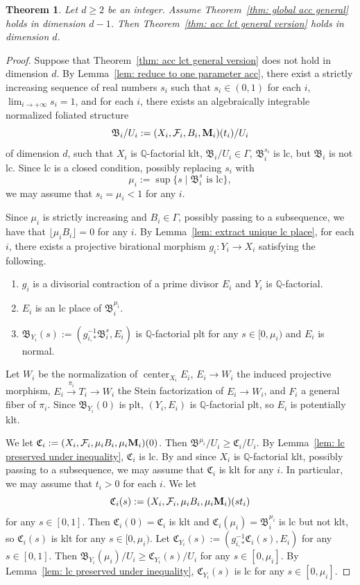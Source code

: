 \documentclass[11pt,reqno]{amsart}
\numberwithin{equation}{section}
\newcommand{\Mm}{{\bf{M}}}
\newcommand{\Cc}{\mathfrak{C}}
\newcommand{\Center}{\operatorname{center}}
\newcommand{\Bb}{{\mathfrak{B}}}
\newcommand{\Ff}{\mathcal{F}}
\newcommand{\Ii}{\Gamma}
\newtheorem{thm}{Theorem}[section]
\theoremstyle{definition}
\begin{document}
\begin{thm}\label{thm: global to local}
   Let $d\geq 2$ be an integer. Assume Theorem~\ref{thm: global acc general} holds in dimension $d-1$. Then Theorem~\ref{thm: acc lct general version} holds in dimension $d$.
\end{thm}
\begin{proof}
Suppose that Theorem~\ref{thm: acc lct general version} does not hold in dimension $d$. By Lemma~\ref{lem: reduce to one parameter acc}, there exist a strictly increasing sequence of real numbers $s_i$ such that $s_i\in (0,1)$ for each $i$, $\lim_{i\rightarrow+\infty}s_i=1$, and for each $i$, there exists an algebraically integrable normalized foliated structure 
$$\Bb_i/U_i:=(X_i,\Ff_i,B_i,\Mm_i)(t_i)/U_i$$
of dimension $d$, such that $X_i$ is $\mathbb Q$-factorial klt, $\Bb_i/U_i\in\Ii$, $\Bb_i^{s_i}$ is lc, but $\Bb_i$ is not lc. Since lc is a closed condition, possibly replacing $s_i$ with
$$\mu_i:=\sup\{s\mid \Bb_i^s\text{ is lc}\},$$
we may assume that $s_i=\mu_i<1$ for any $i$.

Since $\mu_i$ is strictly increasing and $B_i\in\Ii$, possibly passing to a subsequence, we have that $\lfloor\mu_iB_i\rfloor=0$ for any $i$. By Lemma~\ref{lem: extract unique lc place}, for each $i$, there exists a projective birational morphism $g_i: Y_i\rightarrow X_i$ satisfying the following.
\begin{enumerate}
    \item $g_i$ is a divisorial contraction of a prime divisor $E_i$ and $Y_i$ is $\mathbb Q$-factorial.
    \item $E_i$ is an lc place of $\Bb_i^{\mu_i}$.
    \item $\Bb_{Y_i}(s):=(g_{i,*}^{-1}\Bb_i^s,E_i)$ is $\mathbb Q$-factorial plt for any $s\in [0,\mu_i)$ and $E_i$ is normal.
\end{enumerate}
Let $W_i$ be the normalization of $\Center_{X_i}E_i$, $E_i\rightarrow W_i$ the induced projective morphism, 
$E_i\xrightarrow{\pi_i}T_i\rightarrow W_i$ the Stein factorization of $E_i\rightarrow W_i$, and $F_i$ a general fiber of $\pi_i$. Since $\Bb_{Y_i}(0)$ is plt, $(Y_i,E_i)$ is $\mathbb Q$-factorial plt, so $E_i$ is potentially klt. 

We let $\Cc_i:=(X_i,\Ff_i,\mu_iB_i,\mu_i\Mm_i)(0)$. Then $\Bb^{\mu_i}/U_i\geq\Cc_i/U_i$. By Lemma~\ref{lem: lc preserved under inequality}, $\Cc_i$ is lc. By \cite[Theorem~1.5]{BZ16} and since $X_i$ is $\mathbb Q$-factorial klt, possibly passing to a subsequence, we may assume that $\Cc_i$ is klt for any $i$. In particular, we may assume that $t_i>0$ for each $i$. We let 
$$\Cc_i(s):=(X_i,\Ff_i,\mu_iB_i,\mu_i\Mm_i)(st_i)$$
for any $s\in [0,1]$. Then $\Cc_i(0)=\Cc_i$ is klt and $\Cc_i(\mu_i)=\Bb_i^{\mu_i}$ is lc but not klt, so $\Cc_i(s)$ is klt for any $s\in [0,\mu_i)$. Let $\Cc_{Y_i}(s):=(g^{-1}_{i,*}\Cc_i(s),E_i)$ for any $s\in [0,1]$. Then $\Bb_{Y_i}(\mu_i)/U_i\geq\Cc_{Y_i}(s)/U_i$ for any $s\in [0,\mu_i]$. By Lemma~\ref{lem: lc preserved under inequality}, $\Cc_{Y_i}(s)$ is lc for any $s\in [0,\mu_i]$.


\end{proof}
\end{document}
